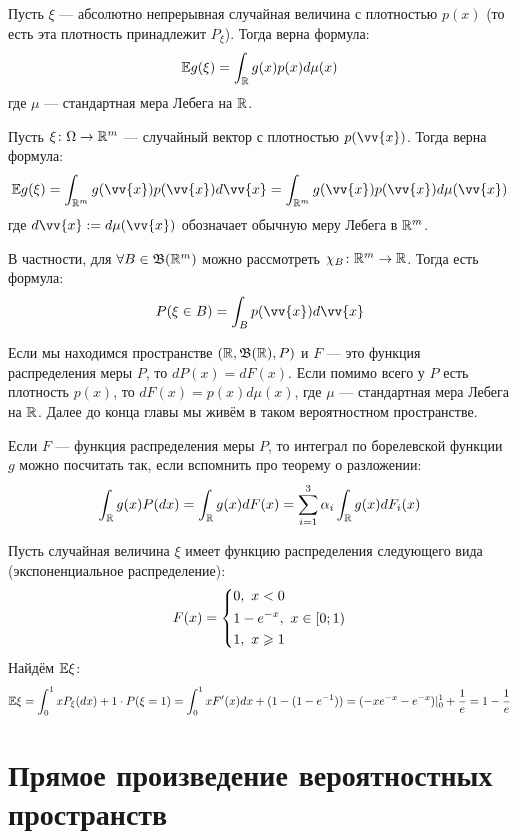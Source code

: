 \begin{corollary}
	Пусть $\xi$ --- абсолютно непрерывная случайная величина с плотностью $p(x)$ (то есть эта плотность принадлежит $P_\xi$). Тогда верна формула:
	\[
		\mathbb{E} g(\xi) = \int_{\mathbb{R}} g(x)p(x)d\mu(x)
	\]
	где $\mu$ --- стандартная мера Лебега на $\mathbb{R}$.
\end{corollary}

\begin{corollary}
	Пусть $\xi \colon \Omega \to \mathbb{R}^m$ --- случайный вектор с плотностью $p(\vv{x})$. Тогда верна формула:
	\[
		\E g(\xi) = \int_{\R^m} g(\vv{x})p(\vv{x})d\vv{x} = \int_{\R^m} g(\vv{x})p(\vv{x})d\mu(\vv{x})
	\]
	где $d\vv{x} := d\mu(\vv{x})$ обозначает обычную меру Лебега в $\mathbb{R}^m$.
\end{corollary}

\begin{note}
	В частности, для $\forall B \in \mathfrak{B}(\mathbb{R}^m)$ можно рассмотреть $\chi_B \colon \mathbb{R}^m \to \mathbb{R}$. Тогда есть формула:
	\[
		P(\xi \in B) = \int_B p(\vv{x})d\vv{x}
	\]
\end{note}

\begin{note}
	Если мы находимся пространстве $(\mathbb{R}, \mathfrak{B}(\mathbb{R}), P)$ и $F$ --- это функция распределения меры $P$, то $dP(x) = dF(x)$. Если помимо всего у $P$ есть плотность $p(x)$, то $dF(x) = p(x)d\mu(x)$, где $\mu$ --- стандартная мера Лебега на $\mathbb{R}$. Далее до конца главы мы живём в таком вероятностном пространстве.
\end{note}

\begin{note}
	Если $F$ --- функция распределения меры $P$, то интеграл по борелевской функции $g$ можно посчитать так, если вспомнить про теорему о разложении:
	\[
		\int_{\mathbb{R}} g(x)P(dx) = \int_{\mathbb{R}} g(x)dF(x) = \sum_{i = 1}^3 \alpha_i \int_{\mathbb{R}} g(x)dF_i(x)
	\]
\end{note}

\begin{example}
	Пусть случайная величина $\xi$ имеет функцию распределения следующего вида (экспоненциальное распределение):
	\[
		F(x) = \left\{\begin{aligned}
			&{0,\ x < 0}
			\\
			&{1 - e^{-x},\ x \in \left[0; 1\right)}
			\\
			&{1,\ x \geqslant 1}
		\end{aligned}\right.
	\]
	Найдём $\mathbb{E}\xi$:
	\[
		\mathbb{E}\xi = \int_0^1 xP_\xi(dx) + 1 \cdot P(\xi = 1) = \int_0^1 xF'(x)dx + (1 - (1 - e^{-1})) = (-xe^{-x} - e^{-x})|_0^1 + \frac{1}{e} = 1 - \frac{1}{e}
	\]
\end{example}

\section{Прямое произведение вероятностных пространств}

